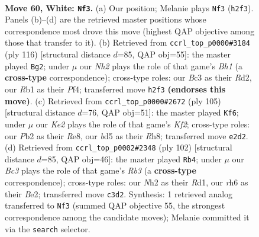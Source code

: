 \documentclass[11pt]{article}
\begin{document}
\clearpage

\begin{figure}[p]\centering
\begin{subfigure}{0.46\textwidth}\centering
\resizebox{\linewidth}{!}{%
\newchessgame
\chessboard[
  setfen={2k1rb2/6p1/p1p4r/Pp1b1p1p/2p2P1P/2B1P1P1/1P2K2N/1R4R1 w - - 21 60},
  showmover=false,
  pgfstyle=straightmove, color=movearrow, markmove={h2-f3}
]}
\caption{}
\end{subfigure}\hfill
\begin{subfigure}{0.46\textwidth}\centering
\resizebox{\linewidth}{!}{%
\newchessgame
\chessboard[
  setfen={1r4b1/2p1k2p/3p3r/pPp2p2/P1P2Pp1/2R1P3/3R1P1P/6KB w - - 68 59},
  showmover=false,
  pgfstyle=straightmove, color=movearrow, markmove={h1-g2}
]}
\caption{}
\end{subfigure}
\\[4pt]
\begin{subfigure}{0.46\textwidth}\centering
\resizebox{\linewidth}{!}{%
\newchessgame
\chessboard[
  setfen={4r2r/2pbpk2/1p1p4/pP1P1Pp1/2P3P1/6K1/P3R1B1/5R2 b - - 48 53},
  showmover=false,
  pgfstyle=straightmove, color=movearrow, markmove={f7-f6}
]}
\caption{}
\end{subfigure}\hfill
\begin{subfigure}{0.46\textwidth}\centering
\resizebox{\linewidth}{!}{%
\newchessgame
\chessboard[
  setfen={r2b4/rp2k3/4p1p1/2Pp1p2/P2P3p/KR2P2P/4B1P1/3R4 w - - 26 52},
  showmover=false,
  pgfstyle=straightmove, color=movearrow, markmove={b3-b4}
]}
\caption{}
\end{subfigure}
\caption{\textbf{Move 60, White: \texttt{Nf3}.} (a) Our position; Melanie plays \texttt{Nf3} (\texttt{h2f3}). Panels (b)--(d) are the retrieved master positions whose correspondence most drove this move (highest QAP objective among those that transfer to it). (b) Retrieved from \texttt{ccrl\_top\_p0000\#3184} (ply 116) [structural distance $d$=85, QAP obj=55]: the master played \texttt{Bg2}; under $\mu$ our \emph{Nh2} plays the role of that game's \emph{Bh1} (a \textbf{cross-type} correspondence); cross-type roles: our \emph{B}c3 as their \emph{R}d2, our \emph{R}b1 as their \emph{P}f4; transferred move \texttt{h2f3} \textbf{(endorses this move)}. (c) Retrieved from \texttt{ccrl\_top\_p0000\#2672} (ply 105) [structural distance $d$=76, QAP obj=51]: the master played \texttt{Kf6}; under $\mu$ our \emph{Ke2} plays the role of that game's \emph{Kf2}; cross-type roles: our \emph{P}b2 as their \emph{R}e8, our \emph{b}d5 as their \emph{R}h8; transferred move \texttt{e2d2}. (d) Retrieved from \texttt{ccrl\_top\_p0002\#2348} (ply 102) [structural distance $d$=85, QAP obj=46]: the master played \texttt{Rb4}; under $\mu$ our \emph{Bc3} plays the role of that game's \emph{Rb3} (a \textbf{cross-type} correspondence); cross-type roles: our \emph{N}h2 as their \emph{R}d1, our \emph{r}h6 as their \emph{B}e2; transferred move \texttt{c3d2}. Synthesis: 1 retrieved analog transferred to \texttt{Nf3} (summed QAP objective 55, the strongest correspondence among the candidate moves); Melanie committed it via the \texttt{search} selector.}
\label{fig:thought-m118}
\end{figure}
\end{document}
